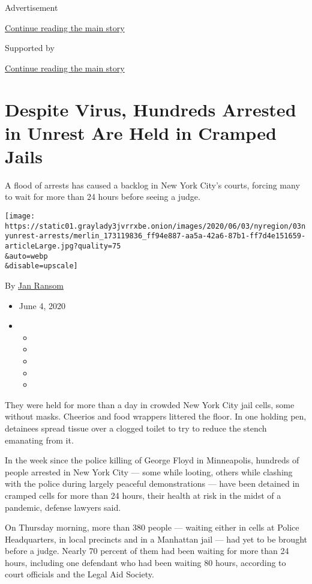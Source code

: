Advertisement

\protect\hyperlink{after-top}{Continue reading the main story}

Supported by

\protect\hyperlink{after-sponsor}{Continue reading the main story}

\hypertarget{despite-virus-hundreds-arrested-in-unrest-are-held-in-cramped-jails}{%
\section{Despite Virus, Hundreds Arrested in Unrest Are Held in Cramped
Jails}\label{despite-virus-hundreds-arrested-in-unrest-are-held-in-cramped-jails}}

A flood of arrests has caused a backlog in New York City's courts,
forcing many to wait for more than 24 hours before seeing a judge.

\texttt{[image: https://static01.graylady3jvrrxbe.onion/images/2020/06/03/nyregion/03nyunrest-arrests/merlin\_173119836\_ff94e887-aa5a-42a6-87b1-ff7d4e151659-articleLarge.jpg?quality=75\\\&auto=webp\\\&disable=upscale]}

By \href{https://www.nytimes3xbfgragh.onion/by/jan-ransom}{Jan Ransom}

\begin{itemize}
\item
  June 4, 2020
\item
  \begin{itemize}
  \item
  \item
  \item
  \item
  \item
  \end{itemize}
\end{itemize}

They were held for more than a day in crowded New York City jail cells,
some without masks. Cheerios and food wrappers littered the floor. In
one holding pen, detainees spread tissue over a clogged toilet to try to
reduce the stench emanating from it.

In the week since the police killing of George Floyd in Minneapolis,
hundreds of people arrested in New York City --- some while looting,
others while clashing with the police during largely peaceful
demonstrations --- have been detained in cramped cells for more than 24
hours, their health at risk in the midst of a pandemic, defense lawyers
said.

On Thursday morning, more than 380 people --- waiting either in cells at
Police Headquarters, in local precincts and in a Manhattan jail --- had
yet to be brought before a judge. Nearly 70 percent of them had been
waiting for more than 24 hours, including one defendant who had been
waiting 80 hours, according to court officials and the Legal Aid
Society.

